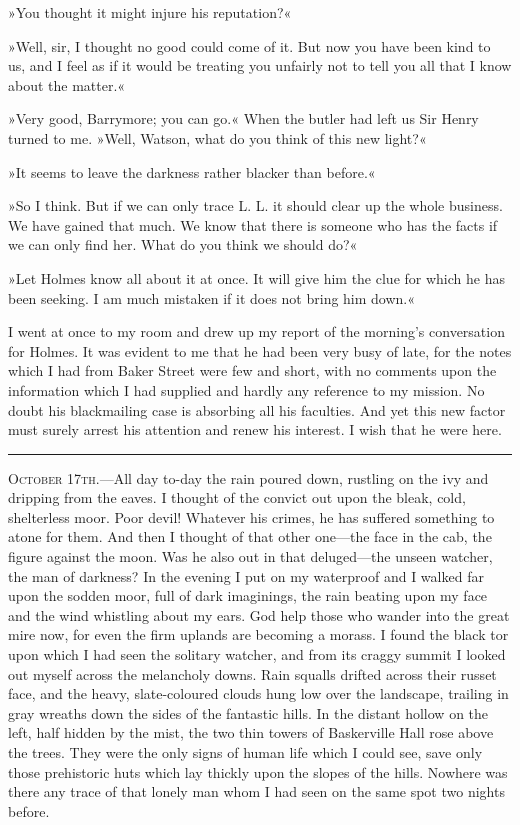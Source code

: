 »You thought it might injure his reputation?«

»Well, sir, I thought no good could come of it. But now you have been kind to us, and I feel as if it would be treating you unfairly not to tell you all that I know about the matter.«

»Very good, Barrymore; you can go.« When the butler had left us Sir Henry turned to me. »Well, Watson, what do you think of this new light?«

»It seems to leave the darkness rather blacker than before.«

»So I think. But if we can only trace L. L. it should clear up the whole business. We have gained that much. We know that there is someone who has the facts if we can only find her. What do you think we should do?«

»Let Holmes know all about it at once. It will give him the clue for which he has been seeking. I am much mistaken if it does not bring him down.«

I went at once to my room and drew up my report of the morning's conversation for Holmes. It was evident to me that he had been very busy of late, for the notes which I had from Baker Street were few and short, with no comments upon the information which I had supplied and hardly any reference to my mission. No doubt his blackmailing case is absorbing all his faculties. And yet this new factor must surely arrest his attention and renew his interest. I wish that he were here.

\noindent\hfil\rule{0.5\textwidth}{.4pt}\hfil 

\textsc{October 17th.}—All day to-day the rain poured down, rustling on the ivy and dripping from the eaves. I thought of the convict out upon the bleak, cold, shelterless moor. Poor devil! Whatever his crimes, he has suffered something to atone for them. And then I thought of that other one—the face in the cab, the figure against the moon. Was he also out in that deluged—the unseen watcher, the man of darkness? In the evening I put on my waterproof and I walked far upon the sodden moor, full of dark imaginings, the rain beating upon my face and the wind whistling about my ears. God help those who wander into the great mire now, for even the firm uplands are becoming a morass. I found the black tor upon which I had seen the solitary watcher, and from its craggy summit I looked out myself across the melancholy downs. Rain squalls drifted across their russet face, and the heavy, slate-coloured clouds hung low over the landscape, trailing in gray wreaths down the sides of the fantastic hills. In the distant hollow on the left, half hidden by the mist, the two thin towers of Baskerville Hall rose above the trees. They were the only signs of human life which I could see, save only those prehistoric huts which lay thickly upon the slopes of the hills. Nowhere was there any trace of that lonely man whom I had seen on the same spot two nights before.

